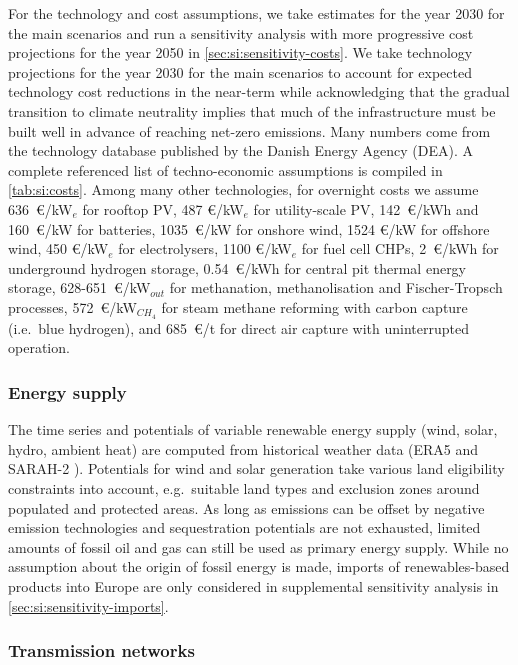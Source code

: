 For the technology and cost assumptions, we take estimates for the year
2030 for the main scenarios and run a sensitivity analysis with more progressive
cost projections for the year 2050 in \cref{sec:si:sensitivity-costs}. We take
technology projections for the year 2030 for the main scenarios to account for
expected technology cost reductions in the near-term while acknowledging that
the gradual transition to climate neutrality implies that much of the
infrastructure must be built well in advance of reaching net-zero emissions.
Many numbers come from the technology database published by the Danish Energy
Agency (DEA).\cite{DEA} A complete referenced list of techno-economic
assumptions is compiled in \cref{tab:si:costs}. Among many other technologies,
for overnight costs we assume 636~\euro/kW$_e$ for rooftop PV, 487 \euro/kW$_e$
for utility-scale PV, 142~\euro/kWh and 160~\euro/kW for batteries,
1035~\euro/kW for onshore wind, 1524 \euro/kW for offshore wind, 450
\euro/kW$_e$ for electrolysers, 1100 \euro/kW$_e$ for fuel cell CHPs,
2~\euro/kWh for underground hydrogen storage, 0.54~\euro/kWh for central pit
thermal energy storage, 628-651~\euro/kW$_{out}$ for methanation,
methanolisation and Fischer-Tropsch processes, 572~\euro/kW$_{CH_4}$ for steam
methane reforming with carbon capture (i.e.~blue hydrogen), and 685~\euro/t for
direct air capture with uninterrupted operation.

\subsubsection*{Energy supply}

The time series and potentials of variable renewable energy supply
(wind, solar, hydro, ambient heat) are computed from historical weather data
(ERA5 \cite{ecmwf} and SARAH-2 \cite{SARAH}). Potentials for wind and solar
generation take various land eligibility constraints into account, e.g.~suitable
land types and exclusion zones around populated and protected areas. As long as
emissions can be offset by negative emission technologies and sequestration
potentials are not exhausted, limited amounts of fossil oil and gas can still be
used as primary energy supply. While no assumption about the origin of fossil
energy is made, imports of renewables-based products into Europe are only
considered in supplemental sensitivity analysis in \cref{sec:si:sensitivity-imports}.

\subsubsection*{Transmission networks}

